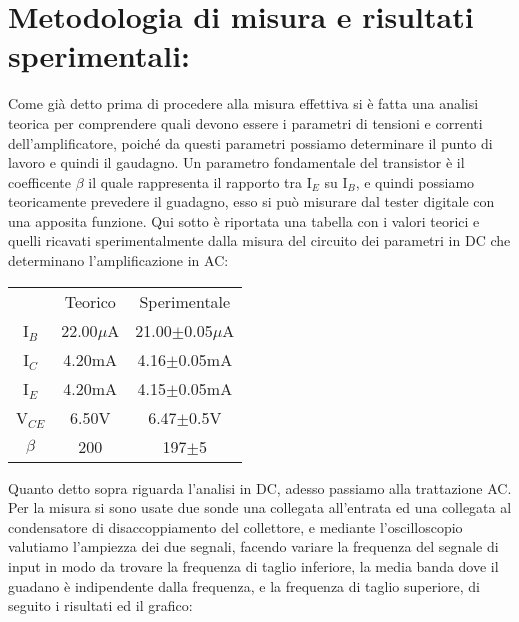 \documentclass{article}
\begin{document}
\section{Metodologia di misura e risultati sperimentali:}
Come già detto prima di procedere alla misura effettiva si è fatta una analisi teorica per comprendere quali devono essere i parametri di tensioni e correnti dell'amplificatore, poiché da questi parametri possiamo determinare il punto di lavoro e quindi il gaudagno. Un parametro fondamentale del transistor è il coefficente $\beta$ il quale rappresenta il rapporto tra I$_{E}$ su I$_{B}$, e quindi possiamo teoricamente prevedere il guadagno, esso si può misurare dal tester digitale con una apposita funzione. Qui sotto è riportata una tabella con i valori teorici e quelli ricavati sperimentalmente dalla misura del circuito dei parametri in DC che determinano l'amplificazione in AC:
\begin{table}[]
    \begin{center}
        \begin{tabular}{c|c|c|}
         &Teorico&Sperimentale\\
      I$_{B}$&22.00$\mu$A&21.00$\pm$0.05$\mu$A\\
      I$_{C}$&4.20mA&4.16$\pm$0.05mA\\
      I$_{E}$&4.20mA&4.15$\pm$0.05mA\\
      V$_{CE}$&6.50V&6.47$\pm$0.5V\\
      $\beta$&200&197$\pm$5\\
      \end{tabular}
   \end{center}
\end{table} 
Quanto detto sopra riguarda l'analisi in DC, adesso passiamo alla trattazione AC. Per la misura si sono usate due sonde una collegata all'entrata ed una collegata al condensatore di disaccoppiamento del collettore, e mediante l'oscilloscopio valutiamo l'ampiezza dei due segnali, facendo variare la frequenza del segnale di input in modo da trovare la frequenza di taglio inferiore, la media banda dove il guadano è indipendente dalla frequenza, e la frequenza di taglio superiore, di seguito i risultati ed il grafico:
\end{document}
